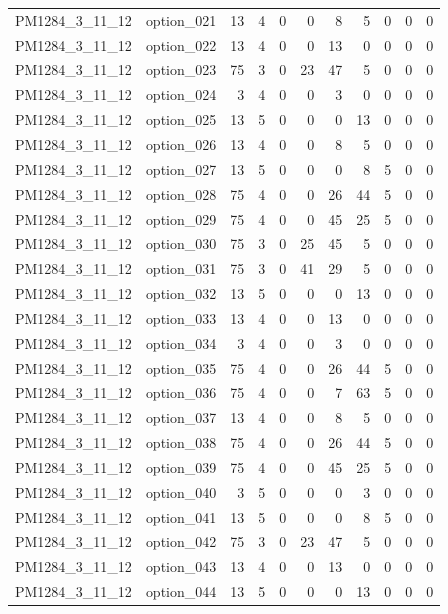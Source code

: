 \begin{tabular}{llrrrrrrrrr}
PM1284\_3\_11\_12 & option\_021 & 13 & 4 & 0 & 0 & 8 & 5 & 0 & 0 & 0 \\
PM1284\_3\_11\_12 & option\_022 & 13 & 4 & 0 & 0 & 13 & 0 & 0 & 0 & 0 \\
PM1284\_3\_11\_12 & option\_023 & 75 & 3 & 0 & 23 & 47 & 5 & 0 & 0 & 0 \\
PM1284\_3\_11\_12 & option\_024 & 3 & 4 & 0 & 0 & 3 & 0 & 0 & 0 & 0 \\
PM1284\_3\_11\_12 & option\_025 & 13 & 5 & 0 & 0 & 0 & 13 & 0 & 0 & 0 \\
PM1284\_3\_11\_12 & option\_026 & 13 & 4 & 0 & 0 & 8 & 5 & 0 & 0 & 0 \\
PM1284\_3\_11\_12 & option\_027 & 13 & 5 & 0 & 0 & 0 & 8 & 5 & 0 & 0 \\
PM1284\_3\_11\_12 & option\_028 & 75 & 4 & 0 & 0 & 26 & 44 & 5 & 0 & 0 \\
PM1284\_3\_11\_12 & option\_029 & 75 & 4 & 0 & 0 & 45 & 25 & 5 & 0 & 0 \\
PM1284\_3\_11\_12 & option\_030 & 75 & 3 & 0 & 25 & 45 & 5 & 0 & 0 & 0 \\
PM1284\_3\_11\_12 & option\_031 & 75 & 3 & 0 & 41 & 29 & 5 & 0 & 0 & 0 \\
PM1284\_3\_11\_12 & option\_032 & 13 & 5 & 0 & 0 & 0 & 13 & 0 & 0 & 0 \\
PM1284\_3\_11\_12 & option\_033 & 13 & 4 & 0 & 0 & 13 & 0 & 0 & 0 & 0 \\
PM1284\_3\_11\_12 & option\_034 & 3 & 4 & 0 & 0 & 3 & 0 & 0 & 0 & 0 \\
PM1284\_3\_11\_12 & option\_035 & 75 & 4 & 0 & 0 & 26 & 44 & 5 & 0 & 0 \\
PM1284\_3\_11\_12 & option\_036 & 75 & 4 & 0 & 0 & 7 & 63 & 5 & 0 & 0 \\
PM1284\_3\_11\_12 & option\_037 & 13 & 4 & 0 & 0 & 8 & 5 & 0 & 0 & 0 \\
PM1284\_3\_11\_12 & option\_038 & 75 & 4 & 0 & 0 & 26 & 44 & 5 & 0 & 0 \\
PM1284\_3\_11\_12 & option\_039 & 75 & 4 & 0 & 0 & 45 & 25 & 5 & 0 & 0 \\
PM1284\_3\_11\_12 & option\_040 & 3 & 5 & 0 & 0 & 0 & 3 & 0 & 0 & 0 \\
PM1284\_3\_11\_12 & option\_041 & 13 & 5 & 0 & 0 & 0 & 8 & 5 & 0 & 0 \\
PM1284\_3\_11\_12 & option\_042 & 75 & 3 & 0 & 23 & 47 & 5 & 0 & 0 & 0 \\
PM1284\_3\_11\_12 & option\_043 & 13 & 4 & 0 & 0 & 13 & 0 & 0 & 0 & 0 \\
PM1284\_3\_11\_12 & option\_044 & 13 & 5 & 0 & 0 & 0 & 13 & 0 & 0 & 0 \\

\end{tabular}
